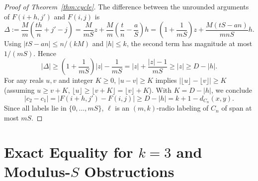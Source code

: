 \documentclass[11pt]{article}
\begin{document}
\begin{proof}[Proof of Theorem~\ref{thm:cycle}]
The difference between the unrounded arguments of $F(i+h, j')$ and $F(i, j)$ is
\[
\Delta := \frac{M}{m}\left(\frac{th}{n} + j' - j\right)
= \frac{M}{mS} z + \frac{M}{m}\left(\frac{t}{n} - \frac{a}{S}\right)h
= \left(1 + \frac{1}{mS}\right)z + \frac{M(tS - an)}{mnS} h.
\]
Using $|tS - an| \le n/(kM)$ and $|h| \le k$, the second term has magnitude at most $1/(mS)$. Hence
\[
|\Delta| \ge \left(1 + \frac{1}{mS}\right)|z| - \frac{1}{mS} = |z| + \frac{|z| - 1}{mS} \ge |z| \ge D - |h|.
\]
For any reals $u, v$ and integer $K \ge 0$, $|u - v| \ge K$ implies $|\lfloor u \rfloor - \lfloor v \rfloor| \ge K$ (assuming $u \ge v + K$, $\lfloor u \rfloor \ge \lfloor v + K \rfloor = \lfloor v \rfloor + K$). With $K = D - |h|$, we conclude
\[
|c_2 - c_1| = |F(i + h, j') - F(i, j)| \ge D - |h| = k + 1 - d_{C_n}(x, y).
\]
Since all labels lie in $\{0, \dots, mS\}$, $\ell$ is an $(m, k)$-radio labeling of $C_n$ of span at most $mS$.
\end{proof}

\section{Exact Equality for $k = 3$ and Modulus-$S$ Obstructions}
\end{document}
